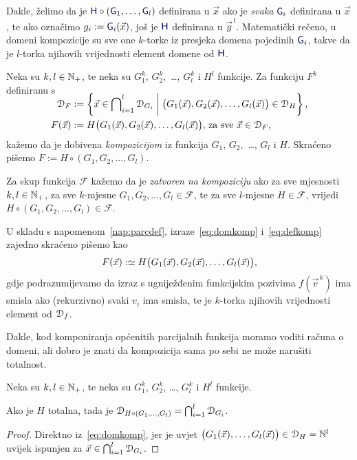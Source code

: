 Dakle, želimo da je $\f H\circ(\f G_1,\dotsc,\f G_l)$ definirana u $\vec x$ ako je \emph{svaka} $\f G_i$ definirana u $\vec x$, te ako označimo $g_i:=\f G_i(\vec x)$, još je $\f H$ definirana u $\vec g^{\,l}$. Matematički rečeno, u domeni kompozicije su sve one $k$-torke iz presjeka domena pojedinih $\f G_i$, takve da je $l$-torka njihovih vrijednosti element domene od $\f H$.
\begin{definicija}[{name=[kompozicija]}]
Neka su $k,l\in{\mathbb N}_+$, te neka su $G_1^k$, $G_2^k$,~\ldots, $G_l^k$ i $H^l$ funkcije. Za funkciju $F^k$ definiranu s
\begin{align}
\SwapAboveDisplaySkip
\label{eq:domkomp}
    \dom{F}&:=\left\{\vec x\in\bigcap\nolimits_{i=1}^l\dom{G_i}\;\middle|\;\bigl(G_1(\vec x),G_2(\vec x),\dotsc,G_l(\vec x)\bigr)\in\dom{H}\right\}\text,\\
\label{eq:defkomp}
    F(\vec x)&:=H\bigl(G_1(\vec x),G_2(\vec x),\dotsc,G_l(\vec x)\bigr)\text{, za sve $\vec x\in\dom F$,}
\end{align}
kažemo da je dobivena \emph{kompozicijom} iz funkcija $G_1$, $G_2$,~\ldots, $G_l$ i $H$. Skraćeno pišemo $F:=H\circ(G_1,G_2,\dotsc,G_l)$. %

Za skup funkcija $\mathcal F$ kažemo da je \emph{zatvoren na kompoziciju} ako za sve mjesnosti $k,l\in{\mathbb N}_+$, za sve $k$-mjesne $G_1,G_2,\dotsc,G_l\in\mathcal F$, te za sve $l$-mjesne $H\in\mathcal F$, vrijedi $H\circ(G_1,G_2,\dotsc,G_l)\in\mathcal F$.
\end{definicija}
U skladu s napomenom~\ref{nap:parcdef}, izraze~\eqref{eq:domkomp} i~\eqref{eq:defkomp} zajedno skraćeno pišemo kao
\begin{equation}
    F(\vec x):\simeq H\bigl(G_1(\vec x),G_2(\vec x),\dotsc,G_l(\vec x)\bigr)\text,
\end{equation}
gdje podrazumijevamo da izraz s ugniježđenim funkcijskim pozivima $f(\vec v^{\,k})$ ima smisla ako (rekurzivno) svaki $v_i$ ima smisla, te je $k$-torka njihovih vrijednosti element od $\mathcal D_{f}$.

Dakle, kod komponiranja općenitih parcijalnih funkcija moramo voditi računa o domeni, ali dobro je znati da kompozicija sama po sebi ne može narušiti totalnost.

\begin{lema}[{name=[domena kompozicije slijeva s totalnom funkcijom]}]\label{lm:comptot}
    Neka su $k,l\in{\mathbb N}_+$, te neka su $G_1^k$, $G_2^k$, \ldots, $G_l^k$ i $H^l$ funkcije.
    
    Ako je $H$ totalna, tada je $\mathcal D_{H\circ(G_1,\dotsc,G_l)}=\bigcap_{i=1}^l\mathcal D_{G_i}$.
\end{lema}
\begin{proof}
    Direktno iz~\eqref{eq:domkomp}, jer je uvjet $\bigl(G_1(\vec x),\dotsc,G_l(\vec x)\bigr)\in\mathcal D_{H}={\mathbb N}^l$ uvijek ispunjen za $\vec x\in\bigcap_{i=1}^l\mathcal D_{G_i}$.
\end{proof}

